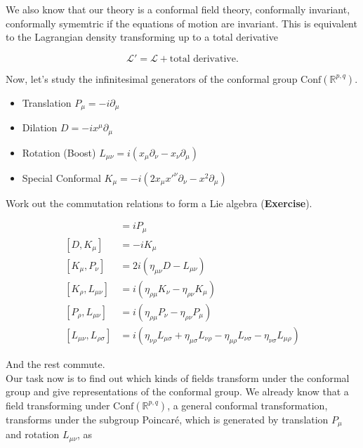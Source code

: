 \noindent We also know that our theory is a conformal field theory, conformally invariant, conformally symemtric if the equations of motion are invariant. This is equivalent to the Lagrangian density transforming up to a total derivative

\begin{equation}
\mathcal{L}' = \mathcal{L} + \text{total derivative}.
\end{equation}

\noindent Now, let's study the infinitesimal generators of the conformal group $\text{Conf} ( \mathbb{R}^{p,q} )$.

\begin{itemize}
\item Translation
	\subitem $P_\mu = -i \partial_\mu$
\item Dilation
	\subitem $D = -i x^\mu \partial_\mu$
\item Rotation (Boost)
	\subitem $L_{\mu\nu} = i (x_\mu \partial_\nu - x_\nu \partial_\mu)$
\item Special Conformal
	\subitem $K_\mu = -i (2 x_\mu x'^\nu \partial_\nu - x^2 \partial_\mu)$
\end{itemize}

\noindent Work out the commutation relations to form a Lie algebra (\textbf{Exercise}).

\begin{align}
[D, P_\mu] &= i P_\mu \\
[D, K_\mu] &= -i K_\mu \\
[K_\mu, P_\nu] &= 2i (\eta_{\mu\nu} D - L_{\mu\nu} ) \\
[K_\rho, L_{\mu\nu}] &= i (\eta_{\rho\mu} K_\nu - \eta_{\rho\nu} K_\mu) \\
[P_\rho, L_{\mu\nu}] &= i (\eta_{\rho\mu} P_\nu - \eta_{\rho\nu} P_\mu ) \\
[L_{\mu\nu}, L_{\rho\sigma}] &= i (\eta_{\nu\rho} L_{\mu\sigma} + \eta_{\mu\sigma} L_{\nu\rho} - \eta_{\mu\rho} L_{\nu\sigma} - \eta_{\nu\sigma} L_{\mu\rho} )
\end{align}

\noindent And the rest commute. \\

\noindent Our task now is to find out which kinds of fields transform under the conformal group and give representations of the conformal group. We already know that a field transforming under $\text{Conf}(\mathbb{R}^{p,q})$, a general conformal transformation, transforms under the subgroup Poincar\'e, which is generated by translation $P_\mu$ and rotation $L_{\mu\nu}$, as

